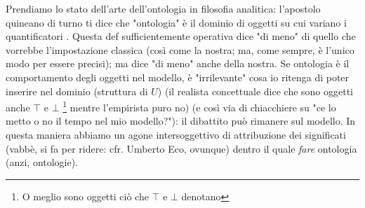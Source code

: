 Prendiamo lo stato dell'arte dell'ontologia in filosofia analitica: l'apostolo quineano di turno ti dice che "ontologia" è il dominio di oggetti su cui variano i quantificatori \cite{?}. Questa def sufficientemente operativa dice "di meno" di quello che vorrebbe l'impostazione classica (così come la nostra; ma, come sempre, è l'unico modo per essere precisi); ma dice "di meno" anche della nostra. Se ontologia è il comportamento degli oggetti nel modello, è "irrilevante" cosa io ritenga di poter inserire nel dominio (struttura di $U$) (il realista concettuale dice che sono oggetti anche $\top$ e $\bot$ \footnote{O meglio sono oggetti ciò che $\top$ e $\bot$ denotano} mentre l'empirista puro no) (e così via di chiacchiere su "ce lo metto o no il tempo nel mio modello?"): il dibattito può rimanere sul modello. In questa maniera abbiamo un agone intersoggettivo di attribuzione dei significati (vabbè, si fa per ridere: cfr. Umberto Eco, ovunque) dentro il quale \emph{fare} ontologia (anzi, ontologie).   
